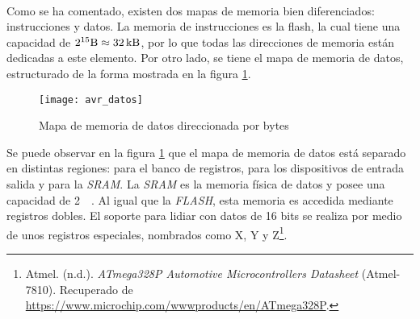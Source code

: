 \paragraph{}
Como se ha comentado, existen dos mapas de memoria bien diferenciados: instrucciones y datos. La memoria de instrucciones es la flash, la cual tiene una capacidad de $2^{15} \unit{\byte} \approx \SI{32}{\kilo\byte}$, por lo que todas las direcciones de memoria est\'an dedicadas a este elemento.
Por otro lado, se tiene el mapa de memoria de datos, estructurado de la forma mostrada en la figura \ref{fig:mem_datos}.
\begin{figure}[h]
    \centering
    \texttt{[image: avr\_datos]}
    \caption{Mapa de memoria de datos direccionada por bytes}
    \label{fig:mem_datos}
\end{figure}
Se puede observar en la figura \ref{fig:mem_datos} que el mapa de memoria de datos est\'a separado en distintas regiones: para el banco de registros, para los dispositivos de entrada salida y para la \textit{SRAM}. La \textit{SRAM} es la memoria f\'isica de datos y posee una capacidad de \SI{2}{\kilo\byte}. Al igual que la \textit{FLASH}, esta memoria es accedida mediante registros dobles. El soporte para lidiar con datos de 16 bits se realiza por medio de unos registros especiales, nombrados como X, Y y Z\footnote{Atmel. (n.d.). \textit{ATmega328P Automotive Microcontrollers Datasheet} (Atmel-7810). Recuperado de \url{https://www.microchip.com/wwwproducts/en/ATmega328P}.}.
